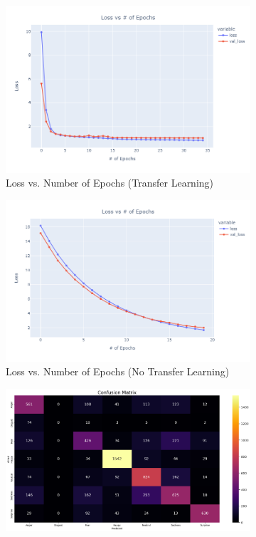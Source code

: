 \documentclass[conference]{IEEEtran}
\begin{document}
\begin{figure}[htbp]
\begin{subfigure}{0.22\textwidth}
        \includegraphics[width=\textwidth]{Figures/loss vs numepochs.png}
        \caption{Loss vs. Number of Epochs (Transfer Learning)}
        \label{fig:loss_tl}
    \end{subfigure}
    \begin{subfigure}{0.22\textwidth}
        \includegraphics[width=\textwidth]{Figures/loss vs numepochs - no TL.png}
        \caption{Loss vs. Number of Epochs (No Transfer Learning)}
        \label{fig:loss_no_tl}
    \end{subfigure}
    \begin{subfigure}{0.22\textwidth}
        \includegraphics[width=\textwidth]{Figures/Confusion Matrix.png}

\end{subfigure}
\end{figure}
\end{document}
